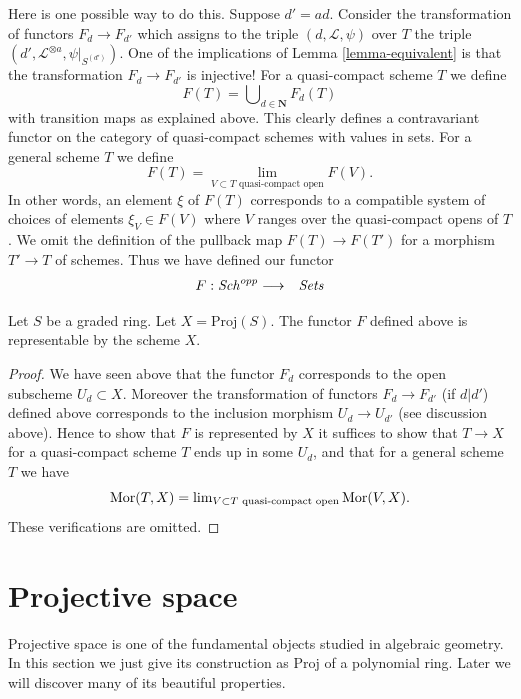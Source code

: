 \medskip\noindent
Here is one possible way to do this. Suppose $d' = ad$.
Consider the transformation of functors $F_d \to F_{d'}$
which assigns to the triple $(d, \mathcal{L}, \psi)$ over
$T$ the triple $(d', \mathcal{L}^{\otimes a}, \psi|_{S^{(d')}})$.
One of the implications of Lemma \ref{lemma-equivalent} is that the
transformation $F_d \to F_{d'}$ is injective!
For a quasi-compact scheme $T$ we define
$$
F(T) = \bigcup\nolimits_{d \in \mathbf{N}} F_d(T)
$$
with transition maps as explained above. This clearly defines a
contravariant functor on the category of quasi-compact schemes
with values in sets. For a general scheme
$T$ we define
$$
F(T)
=
\lim_{V \subset T\text{ quasi-compact open}} F(V).
$$
In other words, an element $\xi$ of $F(T)$ corresponds to a compatible system
of choices of elements $\xi_V \in F(V)$ where $V$ ranges over the
quasi-compact opens of $T$.
We omit the definition of the pullback map $F(T) \to F(T')$
for a morphism $T' \to T$ of schemes.
Thus we have defined our functor
\begin{eqnarray*}
F : \mathit{Sch}^{opp} & \longrightarrow & \textit{Sets}
\end{eqnarray*}

\begin{lemma}
\label{lemma-proj-functor}
Let $S$ be a graded ring.
Let $X = \text{Proj}(S)$.
The functor $F$ defined above is representable by the scheme $X$.
\end{lemma}

\begin{proof}
We have seen above that the functor $F_d$ corresponds to the
open subscheme $U_d \subset X$. Moreover the transformation
of functors $F_d \to F_{d'}$ (if $d | d'$) defined above
corresponds to the inclusion morphism $U_d \to U_{d'}$
(see discussion above). Hence to show that $F$ is represented
by $X$ it suffices to show that $T \to X$ for a quasi-compact
scheme $T$ ends up in some $U_d$, and that for a general scheme
$T$ we have
$$
\mathop{\mathrm{Mor}}\nolimits(T, X)
=
\mathop{\mathrm{lim}}\nolimits_{V \subset T\text{ quasi-compact open}} \mathop{\mathrm{Mor}}\nolimits(V, X).
$$
These verifications are omitted.
\end{proof}







\section{Projective space}
\label{section-projective-space}

\noindent
Projective space is one of the fundamental objects studied in
algebraic geometry. In this section we just give its construction
as $\text{Proj}$ of a polynomial ring. Later we will discover many
of its beautiful properties.

